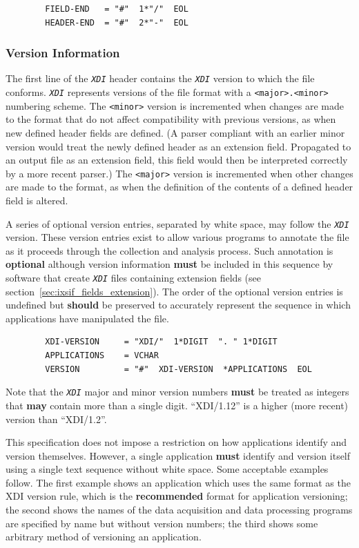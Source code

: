\documentclass{article}
\newcommand{\sltt}[1]{\texttt{\textsl{#1}}}
\newcommand{\xdi}{\sltt{XDI}}
\begin{document}
\begin{verbatim}
        FIELD-END   = "#"  1*"/"  EOL
        HEADER-END  = "#"  2*"-"  EOL
\end{verbatim}


\subsubsection{Version Information}
\label{sec:def_hdr_version}

The first line of the {\xdi} header contains the {\xdi} version to
which the file conforms.  {\xdi} represents versions of the file
format with a \texttt{<major>.<minor>} numbering scheme.  The
\texttt{<minor>} version is incremented when changes are made to the
format that do not affect compatibility with previous versions, as
when new defined header fields are defined.  (A parser compliant with
an earlier minor version would treat the newly defined header as an
extension field.  Propagated to an output file as an extension field,
this field would then be interpreted correctly by a more recent
parser.)  The \texttt{<major>} version is incremented when other
changes are made to the format, as when the definition of the contents
of a defined header field is altered.

A series of optional version entries, separated by white space, may
follow the {\xdi} version.  These version entries exist to allow
various programs to annotate the file as it proceeds through the
collection and analysis process. Such annotation is \textbf{optional}
although version information \textbf{must} be included in this
sequence by software that create {\xdi} files containing extension
fields (see section~\ref{sec:ixsif_fields_extension}).  The order of
the optional version entries is undefined but \textbf{should} be
preserved to accurately represent the sequence in which applications
have manipulated the file.

\begin{verbatim}
        XDI-VERSION     = "XDI/"  1*DIGIT  ". " 1*DIGIT
        APPLICATIONS    = VCHAR
        VERSION         = "#"  XDI-VERSION  *APPLICATIONS  EOL
\end{verbatim}

Note that the {\xdi} major and minor version numbers \textbf{must} be
treated as integers that \textbf{may} contain more than a single
digit.  ``XDI/1.12'' is a higher (more recent) version than
``XDI/1.2''.

This specification does not impose a restriction on how applications
identify and version themselves.  However, a single application
\textbf{must} identify and version itself using a single text sequence
without white space.  Some acceptable examples follow.  The first
example shows an application which uses the same format as the XDI
version rule, which is the \textbf{recommended} format for application
versioning; the second shows the names of the data acquisition and
data processing programs are specified by name but without version
numbers; the third shows some arbitrary method of versioning an
application.
\end{document}
